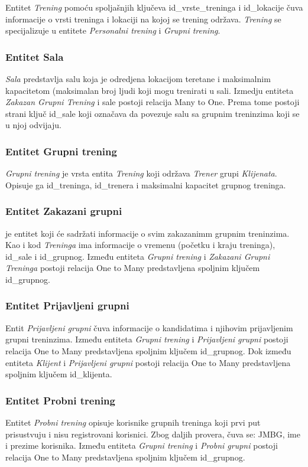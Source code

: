 \documentclass[../main.tex]{subfiles}
\begin{document}
Entitet \textit{Trening} pomoću spoljašnjih ključeva id\_vrste\_treninga i id\_lokacije čuva informacije o vrsti treninga i lokaciji na kojoj se trening održava. \textit{Trening} se specijalizuje u entitete \textit{Personalni trening} i \textit{Grupni trening}.


\subsubsection{Entitet Sala}

\textit{Sala} predstavlja salu koja je odredjena lokacijom teretane i maksimalnim kapacitetom (maksimalan broj ljudi koji mogu trenirati u sali. Izmedju entiteta  \textit{Zakazan Grupni Trening} i sale postoji relacija Many to One. Prema tome postoji strani ključ id\_sale koji označava da povezuje salu sa grupnim treninzima koji se u njoj odvijaju. 

\subsubsection{Entitet Grupni trening}
\textit{Grupni trening} je vrsta entita \textit{Trening} koji održava \textit{Trener} grupi \textit{Klijenata}. Opisuje ga id\_treninga, id\_trenera i maksimalni kapacitet grupnog treninga.

\subsubsection{Entitet Zakazani grupni} je entitet koji će sadržati informacije o svim zakazanimm grupnim treninzima. Kao i kod \textit{Treninga} ima informacije o vremenu (početku i kraju treninga), id\_sale i id\_grupnog. Između entiteta \textit{Grupni trening} i \textit{Zakazani Grupni Treninga} postoji relacija One to Many predstavljena spoljnim ključem id\_grupnog.

\subsubsection{Entitet Prijavljeni grupni} 
Entit \textit{Prijavljeni grupni} čuva informacije o kandidatima i njihovim prijavljenim grupni treninzima. Između entiteta \textit{Grupni trening} i \textit{Prijavljeni grupni} postoji relacija One to Many predstavljena spoljnim ključem id\_grupnog. Dok između entiteta \textit{Klijent} i \textit{Prijavljeni grupni} postoji relacija One to Many predstavljena spoljnim ključem id\_klijenta.


\subsubsection{Entitet Probni trening} 
Entitet \textit{Probni trening} opisuje korisnike grupnih treninga koji prvi put prisustvuju i nisu registrovani korisnici. Zbog daljih provera, čuva se: JMBG, ime i prezime korisnika. Između entiteta \textit{Grupni trening} i \textit{Probni grupni} postoji relacija One to Many predstavljena spoljnim ključem id\_grupnog.
\end{document}
